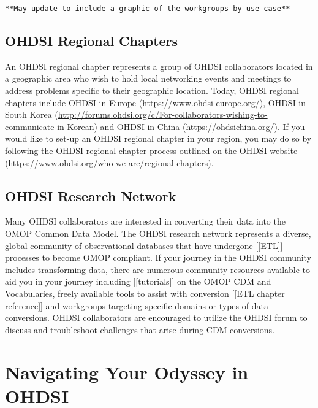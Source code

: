 \documentclass[11pt]{book}
\theoremstyle{definition}
\theoremstyle{definition}
\theoremstyle{definition}
\theoremstyle{remark}
\begin{document}
\texttt{**May\ update\ to\ include\ a\ graphic\ of\ the\ workgroups\ by\ use\ case**}

\hypertarget{ohdsi-regional-chapters}{%
\subsection{OHDSI Regional Chapters}\label{ohdsi-regional-chapters}}

An OHDSI regional chapter represents a group of OHDSI collaborators located in a geographic area who wish to hold local networking events and meetings to address problems specific to their geographic location. Today, OHDSI regional chapters include OHDSI in Europe (\url{https://www.ohdsi-europe.org/}), OHDSI in South Korea (\url{http://forums.ohdsi.org/c/For-collaborators-wishing-to-communicate-in-Korean}) and OHDSI in China (\url{https://ohdsichina.org/}). If you would like to set-up an OHDSI regional chapter in your region, you may do so by following the OHDSI regional chapter process outlined on the OHDSI website (\url{https://www.ohdsi.org/who-we-are/regional-chapters}).

\hypertarget{ohdsi-research-network}{%
\subsection{OHDSI Research Network}\label{ohdsi-research-network}}

Many OHDSI collaborators are interested in converting their data into the OMOP Common Data Model. The OHDSI research network represents a diverse, global community of observational databases that have undergone {[}{[}ETL{]}{]} processes to become OMOP compliant. If your journey in the OHDSI community includes transforming data, there are numerous community resources available to aid you in your journey including {[}{[}tutorials{]}{]} on the OMOP CDM and Vocabularies, freely available tools to assist with conversion {[}{[}ETL chapter reference{]}{]} and workgroups targeting specific domains or types of data conversions. OHDSI collaborators are encouraged to utilize the OHDSI forum to discuss and troubleshoot challenges that arise during CDM conversions.

\hypertarget{navigating-your-odyssey-in-ohdsi}{%
\section{Navigating Your Odyssey in OHDSI}\label{navigating-your-odyssey-in-ohdsi}}
\end{document}

